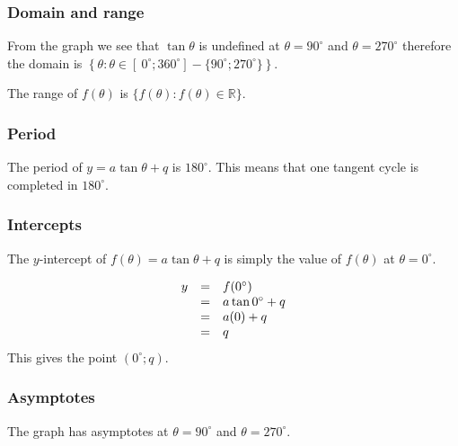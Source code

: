\subsubsection*{Domain and range}

From the graph we see that $\tan\theta$ is undefined at
$\theta = 90^{\circ}$ and $\theta = 270^{\circ}$ therefore the domain is
$\left\{ \theta: \theta \in [~0^{\circ}; 360^{\circ}] - \{90^{\circ}; 270^{\circ}\} \right\}$.

The range of $f(\theta)$ is $\{f(\theta): f(\theta) \in \mathbb{R}\}$.

\subsubsection*{Period}
The period of $y=a\tan\theta+q$ is $180^{\circ}$. This means that one tangent cycle is completed in $180^{\circ}$. 


\subsubsection*{Intercepts}
\nopagebreak
The $y$-intercept of $f(\theta)=a\tan\theta+q$ is simply the value of
$f(\theta)$ at $\theta = {0}^{\circ}$.

\begin{equation*}
\begin{array}{ccl}\hfill y& =& f({0}^{\circ })\hfill \\
 & =& a\tan {0}^{\circ } + q \hfill \\
 & =& a(0)+q\hfill \\
 & =& q\hfill 
\end{array}
\end{equation*}
This gives the point $(0^{\circ}; q)$.
\subsubsection*{Asymptotes}
\nopagebreak
The graph has asymptotes at $\theta ={90}^{\circ }$ and $\theta={270}^{\circ }$.

